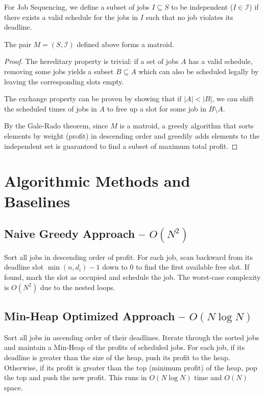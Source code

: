 \documentclass[11pt,a4paper]{article}
\begin{document}
For Job Sequencing, we define a subset of jobs $I \subseteq S$ to be independent ($I \in \mathcal{I}$) if there exists a valid schedule for the jobs in $I$ such that no job violates its deadline.

\begin{theorem}
The pair $M = (S, \mathcal{I})$ defined above forms a matroid.
\end{theorem}

\begin{proof}
The hereditary property is trivial: if a set of jobs $A$ has a valid schedule, removing some jobs yields a subset $B \subseteq A$ which can also be scheduled legally by leaving the corresponding slots empty.

The exchange property can be proven by showing that if $|A| < |B|$, we can shift the scheduled times of jobs in $A$ to free up a slot for some job in $B \setminus A$.

By the Gale-Rado theorem, since $M$ is a matroid, a greedy algorithm that sorts elements by weight (profit) in descending order and greedily adds elements to the independent set is guaranteed to find a subset of maximum total profit.
\end{proof}

\section{Algorithmic Methods and Baselines}

\subsection{Naive Greedy Approach -- $O(N^2)$}
Sort all jobs in descending order of profit. For each job, scan backward from its deadline slot $\min(n, d_i) - 1$ down to 0 to find the first available free slot. If found, mark the slot as occupied and schedule the job. The worst-case complexity is $O(N^2)$ due to the nested loops.

\subsection{Min-Heap Optimized Approach -- $O(N \log N)$}
Sort all jobs in ascending order of their deadlines. Iterate through the sorted jobs and maintain a Min-Heap of the profits of scheduled jobs. For each job, if its deadline is greater than the size of the heap, push its profit to the heap. Otherwise, if its profit is greater than the top (minimum profit) of the heap, pop the top and push the new profit. This runs in $O(N \log N)$ time and $O(N)$ space.
\end{document}
